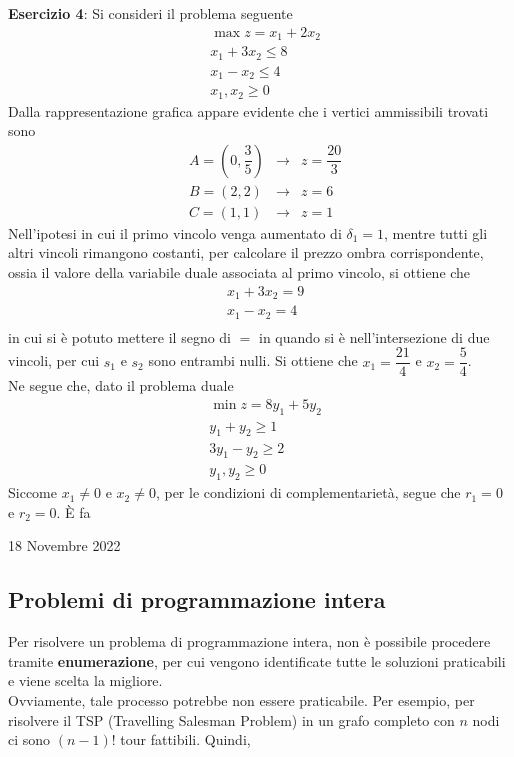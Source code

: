 \documentclass[a4paper]{extarticle}
\begin{document}
\vspace{1em}
\noindent
\textbf{Esercizio 4}: Si consideri il problema seguente
\begin{align*}
    &\max z = x_1 + 2x_2\\
    &x_1 + 3x_2 \leq 8\\
    &x_1 - x_2 \leq 4\\
    &x_1,x_2 \geq 0
\end{align*}
Dalla rappresentazione grafica appare evidente che i vertici ammissibili trovati sono
\begin{align*}
    &A = \left(0,\dfrac{3}{5}\right) & \rightarrow & z=\dfrac{20}{3}\\
    &B=(2,2) & \rightarrow & z=6\\
    &C=(1,1) & \rightarrow & z=1
\end{align*}
Nell'ipotesi in cui il primo vincolo venga aumentato di $\delta_1=1$, mentre tutti gli altri vincoli rimangono costanti, per calcolare il prezzo ombra corrispondente, ossia il valore della variabile duale associata al primo vincolo, si ottiene che
\begin{align*}
    &x_1 + 3x_2 = 9\\
    &x_1 - x_2 = 4\\
\end{align*}
in cui si è potuto mettere il segno di $=$ in quando si è nell'intersezione di due vincoli, per cui $s_1$ e $s_2$ sono entrambi nulli. Si ottiene che $x_1=\dfrac{21}{4}$ e $x_2=\dfrac{5}{4}$.\\
Ne segue che, dato il problema duale
\begin{align*}
    &\min z = 8y_1 + 5y_2\\
    &y_1 + y_2 \geq 1\\
    &3y_1 - y_2 \geq 2\\
    &y_1,y_2 \geq 0
\end{align*}
Siccome $x_1 \neq 0$ e $x_2 \neq 0$, per le condizioni di complementarietà, segue che $r_1=0$ e $r_2=0$. È fa

\newpage
\begin{center}
    18 Novembre 2022
\end{center}
\subsection{Problemi di programmazione intera}
Per risolvere un problema di programmazione intera, non è possibile procedere tramite \textbf{enumerazione}, per cui vengono identificate tutte le soluzioni praticabili e viene scelta la migliore.\\
Ovviamente, tale processo potrebbe non essere praticabile. Per esempio, per risolvere il TSP (Travelling Salesman Problem) in un grafo completo con $n$ nodi ci sono $(n - 1)!$ tour fattibili. Quindi,
\end{document}
